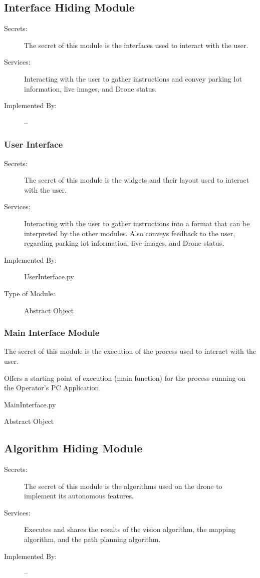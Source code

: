 \documentclass[12pt, titlepage]{article}
\begin{document}
\subsection{Interface Hiding Module}
\begin{description}
\item[Secrets:] The secret of this module is the interfaces used to interact with the user.
\item[Services:] Interacting with the user to gather instructions and convey parking lot information, live images, and Drone status. 
\item[Implemented By:] --
\end{description}
\subsubsection{User Interface}
\label{User Interface}
\begin{description}
\item[Secrets:] The secret of this module is the widgets and their layout used to interact with the user. 
\item[Services:] Interacting with the user to gather instructions into a format that can be interpreted by the other modules. Also conveys feedback to the user, regarding parking lot information, live images, and Drone status.
\item[Implemented By:] UserInterface.py
\item[Type of Module:] Abstract Object
\end{description}
\subsubsection{Main Interface Module}
\begin{description}
\label{Main Interface Module}
\item[Secrets:] The secret of this module is the execution of the process used to interact with the user.
\item[Services:] Offers a starting point of execution (main function) for the process running on the Operator's PC Application. 
\item[Implemented By:] MainInterface.py
\item[Type of Module:] Abstract Object
\end{description}

\subsection{Algorithm Hiding Module}
\begin{description}
\item[Secrets:] The secret of this module is the algorithms used on the drone to implement its autonomous features.
\item[Services:] Executes and shares the results of the vision algorithm, the mapping algorithm, and the path planning algorithm.
\item[Implemented By:] --
\end{description}
\end{document}
